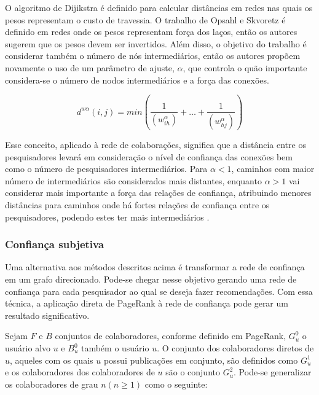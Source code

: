 \documentclass[12pt]{article}
\begin{document}
O algoritmo de Dijikstra \cite{dijkstra1959note} é definido para calcular distâncias em redes nas quais os pesos representam o 
custo de travessia. O trabalho de Opsahl e Skvoretz \cite{opsahl2010node} é definido em redes onde os pesos representam força 
dos laços, então os autores sugerem que os pesos devem ser invertidos. Além disso, o objetivo do trabalho é considerar também 
o número de nós intermediários, então os autores propõem novamente o uso de um parâmetro de ajuste, $\alpha$, que controla o quão 
importante considera-se o número de nodos intermediários e a força das conexões.

\begin{equation} \label{eqn:distance}
  d^{w\alpha}(i, j) = min \left( \frac{1}{ \left( w_{ih}^{\alpha} \right) } + \dots + \frac{1}{ \left( w_{hj}^{\alpha} \right) }  \right) 
\end{equation}

Esse conceito, aplicado à rede de colaborações, significa que a distância entre os pesquisadores levará em consideração o nível 
de confiança das conexões bem como o número de pesquisadores intermediários. Para $\alpha < 1$, caminhos com maior número de 
intermediários são considerados mais distantes, enquanto $\alpha > 1$ vai considerar mais importante a força das relações de 
confiança, atribuindo menores distâncias para caminhos onde há fortes relações de confiança entre os pesquisadores, podendo estes 
ter mais intermediários \cite{opsahl2010node}.

\subsubsection{Confiança subjetiva}

Uma alternativa aos métodos descritos acima é transformar a rede de confiança em um grafo direcionado. Pode-se chegar nesse objetivo 
gerando uma rede de confiança para cada pesquisador ao qual se deseja fazer recomendações. Com essa técnica, a aplicação direta 
de PageRank à rede de confiança pode gerar um resultado significativo.

Sejam $F$ e $B$ conjuntos de colaboradores, conforme definido em PageRank, $G_{u}^{0}$ o usuário alvo $u$ e $B_{u}^{0}$ também o 
usuário $u$. O conjunto dos colaboradores diretos de $u$, aqueles com os quais $u$ possui publicações em conjunto, são definidos 
como $G_{u}^{1}$ e os colaboradores dos colaboradores de $u$ são o conjunto $G_{u}^{2}$. Pode-se generalizar os colaboradores 
de grau $n (n \geq 1)$ como o seguinte:
\end{document}
